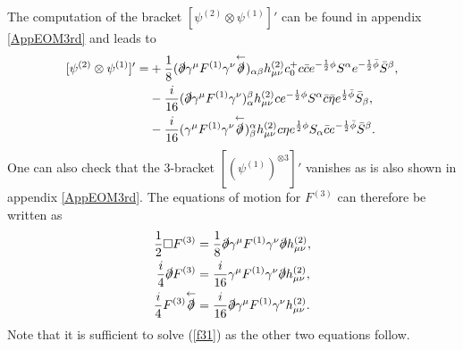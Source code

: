 \documentclass[12pt]{article}
\numberwithin{equation}{section}
\newcommand{\B}[1]{\bar{#1}}
\begin{document}
The computation of the bracket $[\psi^{(2)} \otimes \psi^{(1)}]'$ can be found in appendix \ref{AppEOM3rd} and leads to
\begin{equation}
\begin{split}
    [\psi^{(2)} \otimes \psi^{(1)}]'=&+\frac{1}{8}(\slashed{\partial}\gamma^{\mu} F^{(1)}\gamma^{\nu}\overset{\leftarrow}{\slashed{\partial}})_{\alpha \beta}h^{(2)}_{\mu\nu}c_0^+c\B{c}e^{-\frac{1}{2}\phi}S^{\alpha}e^{-\frac{1}{2}\B{\phi}}\B{S}^{\beta},\\
    &-\frac{i}{16}(\slashed{\partial}\gamma^{\mu}F^{(1)}\gamma^{\nu})_{\alpha}^{\beta}h^{(2)}_{\mu\nu}ce^{-\frac{1}{2}\phi}S^{\alpha}\B{c}\B{\eta}e^{\frac{1}{2}\B{\phi}}\B{S}_{\beta},\\
    &-\frac{i}{16}(\gamma^{\mu} F^{(1)}\gamma^{\nu}\overset{\leftarrow}{\slashed{\partial}})^\alpha_{
    \beta} h^{(2)}_{\mu\nu}c\eta e^{\frac{1}{2}\phi}S_{\alpha}\B{c}e^{-\frac{1}{2}\B{\phi}}\B{S}^{\beta}.
\end{split}
\end{equation}
One can also check that the 3-bracket $[(\psi^{(1)})^{\otimes 3}]'$ vanishes as is also shown in appendix \ref{AppEOM3rd}. The equations of motion for $F^{(3)}$ can therefore be written as
\begin{align}
    \frac{1}{2}\Box F^{(3)}&=\frac{1}{8}\slashed{\partial}\gamma^{\mu}F^{(1)}\gamma^{\nu}\slashed{\partial}h^{(2)}_{\mu\nu},\\
    \label{f31}
    \frac{i}{4}\slashed{\partial}F^{(3)}&=\frac{i}{16}\gamma^{\mu}F^{(1)}\gamma^{\nu}\slashed{\partial}h^{(2)}_{\mu\nu},\\
    \label{f32}
    \frac{i}{4}F^{(3)}\overset{\leftarrow}{\slashed{\partial}}&=\frac{i}{16}\slashed{\partial}\gamma^{\mu}F^{(1)}\gamma^{\nu}h^{(2)}_{\mu\nu}.
\end{align}
Note that it is sufficient to solve (\ref{f31}) as the other two equations follow.
\end{document}
